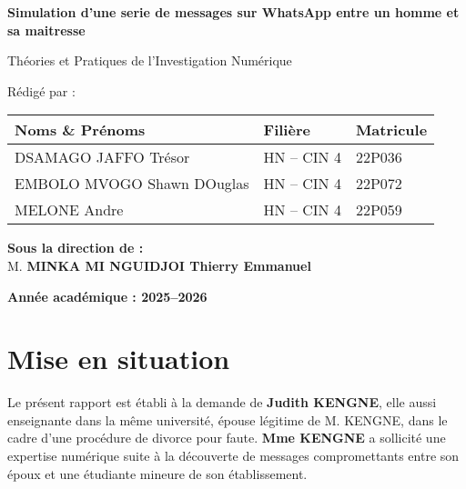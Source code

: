 \documentclass[12pt, a4paper]{article}
\begin{document}
\begin{titlepage}

	\vspace{1cm}

	{\LARGE \textbf{Simulation d'une serie de messages sur WhatsApp entre un homme et sa maitresse}}

	\vspace{0.5cm}

	{\LARGE {Théories et Pratiques de l'Investigation Numérique}}

	\vspace{2cm}

	{\large Rédigé par :}

	\vspace{0.5cm}

	\begin{tabular}{|>{\centering\arraybackslash}m{8cm}
		|>{\centering\arraybackslash}m{4cm}
		|>{\centering\arraybackslash}m{3cm}|}
		\hline
		\textbf{Noms \& Prénoms}   & \textbf{Filière} & \textbf{Matricule} \\
		\hline
		DSAMAGO JAFFO Trésor       & HN -- CIN 4      & 22P036             \\
		\hline
		EMBOLO MVOGO Shawn DOuglas & HN -- CIN 4      & 22P072             \\
		\hline
		MELONE Andre      & HN -- CIN 4      & 22P059             \\
		\hline
	\end{tabular}

	\vfill

	\begin{Large}
		\textbf{Sous la direction de :} \\
		M. \textbf{MINKA MI NGUIDJOI Thierry Emmanuel} \\
	\end{Large}

	\vspace{0.5cm}

	\vspace{1cm}

	\textbf{Année académique : 2025--2026}
\end{titlepage}

\section{Mise en situation}
Le présent rapport est établi à la demande de \textbf{Judith KENGNE}, elle
aussi enseignante dans la même université, épouse légitime de M. KENGNE, dans
le cadre d’une procédure de divorce pour faute. \textbf{Mme KENGNE} a sollicité
une expertise numérique suite à la découverte de messages compromettants entre
son époux et une étudiante mineure de son établissement.
\end{document}
